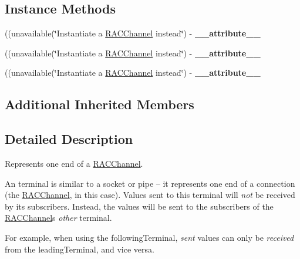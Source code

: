 \subsection*{Instance Methods}
\begin{DoxyCompactItemize}
\item 
\mbox{\label{interface_r_a_c_channel_terminal_a9292333e9c26622eabe4eea2d15abbd7}} 
((unavailable(\char`\"{}Instantiate a \mbox{\hyperlink{interface_r_a_c_channel}{R\+A\+C\+Channel}} instead\char`\"{}) -\/ {\bfseries \+\_\+\+\_\+attribute\+\_\+\+\_\+}
\item 
\mbox{\label{interface_r_a_c_channel_terminal_a9292333e9c26622eabe4eea2d15abbd7}} 
((unavailable(\char`\"{}Instantiate a \mbox{\hyperlink{interface_r_a_c_channel}{R\+A\+C\+Channel}} instead\char`\"{}) -\/ {\bfseries \+\_\+\+\_\+attribute\+\_\+\+\_\+}
\item 
\mbox{\label{interface_r_a_c_channel_terminal_a9292333e9c26622eabe4eea2d15abbd7}} 
((unavailable(\char`\"{}Instantiate a \mbox{\hyperlink{interface_r_a_c_channel}{R\+A\+C\+Channel}} instead\char`\"{}) -\/ {\bfseries \+\_\+\+\_\+attribute\+\_\+\+\_\+}
\end{DoxyCompactItemize}
\subsection*{Additional Inherited Members}


\subsection{Detailed Description}
Represents one end of a \mbox{\hyperlink{interface_r_a_c_channel}{R\+A\+C\+Channel}}.

An terminal is similar to a socket or pipe -- it represents one end of a connection (the \mbox{\hyperlink{interface_r_a_c_channel}{R\+A\+C\+Channel}}, in this case). Values sent to this terminal will {\itshape not} be received by its subscribers. Instead, the values will be sent to the subscribers of the \mbox{\hyperlink{interface_r_a_c_channel}{R\+A\+C\+Channel}}\textquotesingle{}s {\itshape other} terminal.

For example, when using the {\ttfamily following\+Terminal}, {\itshape sent} values can only be {\itshape received} from the {\ttfamily leading\+Terminal}, and vice versa.

